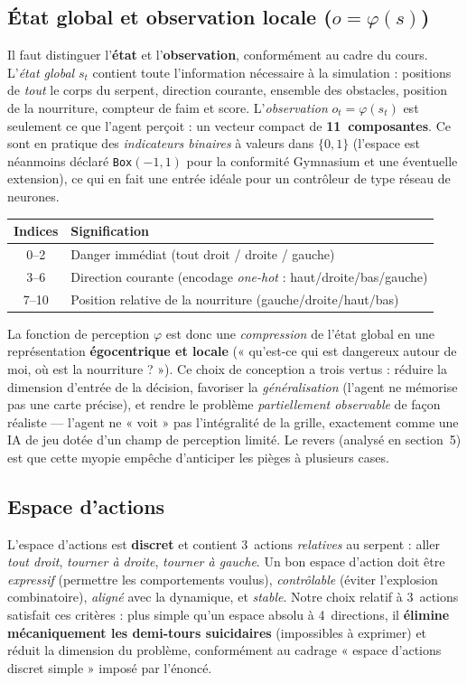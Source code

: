 \documentclass[11pt,a4paper]{article}
\begin{document}
\subsection{État global et observation locale ($o = \varphi(s)$)}
Il faut distinguer l'\textbf{état} et l'\textbf{observation}, conformément au cadre
du cours. L'\emph{état global} $s_t$ contient toute l'information nécessaire à la
simulation : positions de \emph{tout} le corps du serpent, direction courante,
ensemble des obstacles, position de la nourriture, compteur de faim et score.
L'\emph{observation} $o_t = \varphi(s_t)$ est seulement ce que l'agent perçoit : un
vecteur compact de \textbf{11~composantes}. Ce sont en pratique des
\emph{indicateurs binaires} à valeurs dans $\{0,1\}$ (l'espace est néanmoins déclaré
\texttt{Box}$(-1,1)$ pour la conformité Gymnasium et une éventuelle extension), ce
qui en fait une entrée idéale pour un contrôleur de type réseau de neurones.
\begin{center}
\begin{tabular}{cl}
\toprule
\textbf{Indices} & \textbf{Signification} \\
\midrule
0--2  & Danger immédiat (tout droit / droite / gauche) \\
3--6  & Direction courante (encodage \emph{one-hot} : haut/droite/bas/gauche) \\
7--10 & Position relative de la nourriture (gauche/droite/haut/bas) \\
\bottomrule
\end{tabular}
\end{center}
La fonction de perception $\varphi$ est donc une \emph{compression} de l'état global
en une représentation \textbf{égocentrique et locale} (« qu'est-ce qui est dangereux
autour de moi, où est la nourriture ? »). Ce choix de conception a trois vertus :
réduire la dimension d'entrée de la décision, favoriser la \emph{généralisation}
(l'agent ne mémorise pas une carte précise), et rendre le problème
\emph{partiellement observable} de façon réaliste — l'agent ne « voit » pas
l'intégralité de la grille, exactement comme une IA de jeu dotée d'un champ de
perception limité. Le revers (analysé en section~5) est que cette myopie empêche
d'anticiper les pièges à plusieurs cases.

\subsection{Espace d'actions}
L'espace d'actions est \textbf{discret} et contient 3~actions \emph{relatives}
au serpent : aller \emph{tout droit}, \emph{tourner à droite}, \emph{tourner à
gauche}. Un bon espace d'action doit être \emph{expressif} (permettre les
comportements voulus), \emph{contrôlable} (éviter l'explosion combinatoire),
\emph{aligné} avec la dynamique, et \emph{stable}. Notre choix relatif à 3~actions
satisfait ces critères : plus simple qu'un espace absolu à 4~directions, il
\textbf{élimine mécaniquement les demi-tours suicidaires} (impossibles à exprimer)
et réduit la dimension du problème, conformément au cadrage « espace d'actions
discret simple » imposé par l'énoncé.
\end{document}
